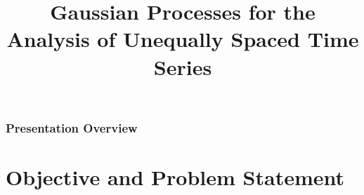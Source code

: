 \documentclass[
	9pt, %
]{beamer}
\title[Master's Thesis]{Gaussian Processes for the Analysis of Unequally Spaced Time Series} %
\author[Gianna Marano]{} %
\begin{document}

\begin{frame}
	\titlepage %
\end{frame}



\begin{frame}
	\frametitle{Presentation Overview} %

	\tableofcontents %
\end{frame}


\section{Objective and Problem Statement} %
\end{document}

